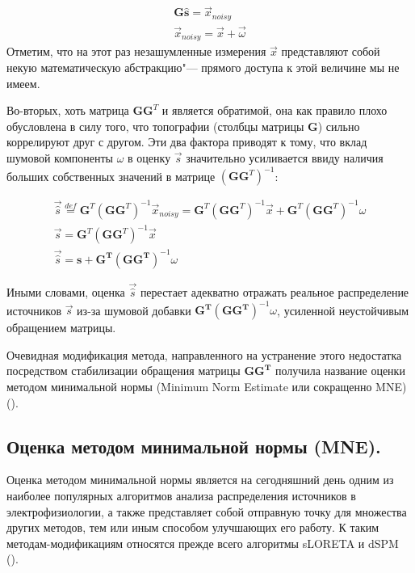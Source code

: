\begin{gather}
    \mathbf{G\hat{s}} = \vec{x}_{noisy}
    \label{original_linear_w_noise}\\
    \vec{x}_{noisy} = \vec{x} + \vec{\omega}
\end{gather}
Отметим, что на этот раз незашумленные измерения $\vec{x}$ представляют
собой некую математическую абстракцию"--- прямого доступа к этой величине мы
не имеем.

Во-вторых, хоть матрица $\mathbf{G}\mathbf{G}^T$ и является обратимой, она как
правило плохо обусловлена в силу того, что топографии (столбцы матрицы
$\mathbf{G}$) сильно коррелируют друг с другом.  Эти два фактора
приводят к тому, что вклад шумовой компоненты $\omega$ в оценку $\vec{s}$
значительно усиливается ввиду наличия больших собственных значений в матрице
${(\mathbf{G}\mathbf{G}^T)}^{-1}$:

\begin{gather*}
    \vec{\hat{s}} \stackrel{def}{=} \mathbf{G}^T{(\mathbf{G}\mathbf{G}^T)}^{-1}\vec{x}_{noisy} = 
    \mathbf{G}^T{(\mathbf{G}\mathbf{G}^T)}^{-1}\vec{x} +
    \mathbf{G}^T{(\mathbf{G}\mathbf{G}^T)}^{-1}\omega\\
    \vec{s} = \mathbf{G}^T{(\mathbf{G}\mathbf{G}^T)}^{-1}\vec{x}
    \\
    \vec{\hat{s}} =  \mathbf{s + G^T{(GG^T)}}^{-1}\omega
\end{gather*}

Иными словами, оценка $\vec{\hat{s}}$ перестает адекватно отражать реальное распределение
источников $\vec{s}$ из-за шумовой добавки $\mathbf{G^T{(GG^T)}}^{-1}\omega$, усиленной
неустойчивым обращением матрицы.

Очевидная модификация метода, направленного на устранение этого недостатка
посредством стабилизации обращения матрицы $\mathbf{GG^T}$ получила название
оценки методом минимальной нормы (Minimum Norm Estimate или сокращенно MNE)
(\cite{MNE_paper}).

\subsection{Оценка методом минимальной нормы (MNE).}

Оценка методом минимальной нормы является на сегодняшний день одним из наиболее
популярных алгоритмов анализа распределения источников в электрофизиологии, а
также представляет собой отправную точку для множества других методов, тем или
иным способом улучшающих его работу. К таким методам-модификациям относятся
прежде всего алгоритмы sLORETA и dSPM (\cite{sLORETA_paper, dSPM_paper}).

